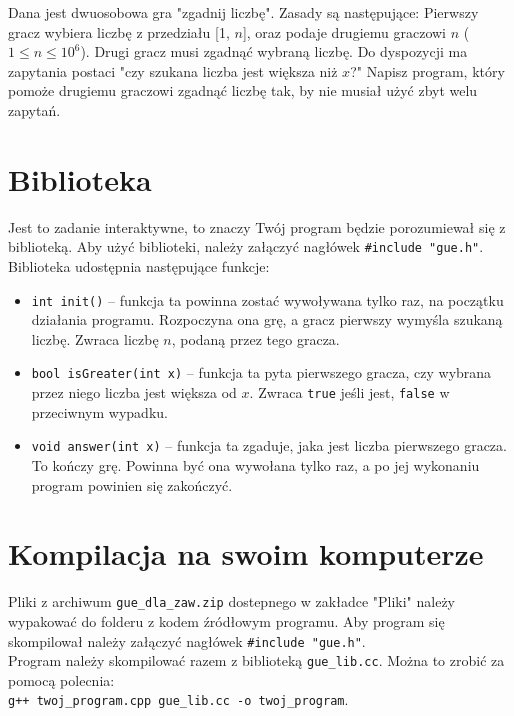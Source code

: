 \documentclass{spiral}
\begin{document}
  \makeheader

  Dana jest dwuosobowa gra "zgadnij liczbę". Zasady są następujące:
  Pierwszy gracz wybiera liczbę z przedziału [1, $n$],
  oraz podaje drugiemu graczowi $n$ ($1 \leq n \leq 10^6$).
  Drugi gracz musi zgadnąć wybraną liczbę. 
  Do dyspozycji ma zapytania postaci "czy szukana liczba jest większa niż $x$?"
  Napisz program, który pomoże drugiemu graczowi zgadnąć liczbę tak,
  by nie musiał użyć zbyt welu zapytań.

  \section{Biblioteka}
    Jest to zadanie interaktywne,
    to znaczy Twój program będzie porozumiewał się z biblioteką.
    Aby użyć biblioteki, należy załączyć nagłówek \texttt{\#include "{}gue.h"{}}.
    Biblioteka udostępnia następujące funkcje:
    \begin{itemize}
        \item \texttt{int init()} -- funkcja ta powinna zostać wywoływana
        tylko raz, na początku działania programu.
        Rozpoczyna ona grę, a gracz pierwszy wymyśla szukaną liczbę.
        Zwraca liczbę $n$, podaną przez tego gracza.

        \item \texttt{bool isGreater(int x)} -- funkcja ta pyta pierwszego gracza,
        czy wybrana przez niego liczba jest większa od $x$.
        Zwraca \texttt{true} jeśli jest, \texttt{false} w przeciwnym wypadku.

        \item \texttt{void answer(int x)} -- funkcja ta zgaduje,
        jaka jest liczba pierwszego gracza. To kończy grę.
        Powinna być ona wywołana tylko raz,
        a po jej wykonaniu program powinien się zakończyć.
    \end{itemize}

  \section{Kompilacja na swoim komputerze}
    Pliki z archiwum \texttt{gue\_dla\_zaw.zip} dostepnego w zakładce "Pliki"
    należy wypakować do folderu z kodem źródłowym programu.
    Aby program się skompilował należy załączyć nagłówek
    \texttt{\#include "gue.h"}.\\
    Program należy skompilować razem z biblioteką \texttt{gue\_lib.cc}.
    Można to zrobić za pomocą polecnia: \\
    \texttt{g++~twoj\_program.cpp~gue\_lib.cc~-o~twoj\_program}.
\end{document}
